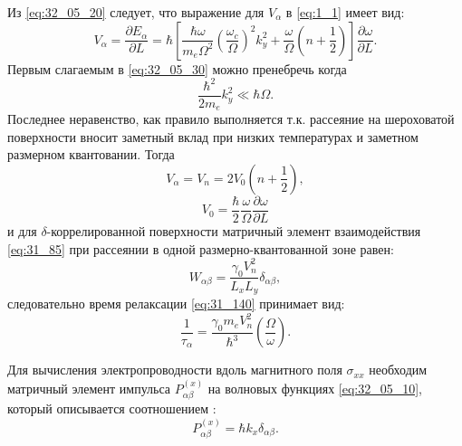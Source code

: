 Из \eqref{eq:32_05_20} следует, что выражение для $ V_{\alpha}$ в \eqref{eq:1_1} имеет вид:
\begin{equation} \label{eq:32_05_30}
V_{\alpha} = \frac{\partial E_{\alpha }}{\partial L}=\hbar \left[\frac{\hbar\omega}{m_e \Omega^2} {\left(\frac{\omega_c}{\Omega }\right)}^2 k^2_y+\frac{\omega}{\Omega} \left(n+\frac{1}{2}\right)\right] \frac{\partial\omega}{\partial L}.
\end{equation}
Первым слагаемым в \eqref{eq:32_05_30} можно пренебречь когда
\[
\frac{\hbar^2}{2m_e}k^2_y \ll \hbar \Omega.
\]
Последнее неравенство, как правило выполняется т.к. рассеяние на шероховатой поверхности вносит заметный вклад при низких температурах и заметном размерном квантовании. Тогда
\begin{equation} \label{eq:32_05_40}
V_{\alpha} = V_n = 2 V_0 \left(n+\frac{1}{2}\right),
\end{equation}
\begin{equation} \label{eq:32_05_42}
V_0 = \frac{\hbar}{2} \frac{\omega}{\Omega} \frac{\partial\omega}{\partial L}
\end{equation}
и для $\delta$-коррелированной поверхности матричный элемент взаимодействия \eqref{eq:31_85} при рассеянии в одной размерно-квантованной зоне равен:
\begin{equation} \label{eq:32_05_50}
W_{\alpha \beta }=\frac{\gamma_0 V^2_n}{L_x L_y} \delta_{\alpha \beta},
\end{equation}
следовательно время релаксации \eqref{eq:31_140} принимает вид:
\begin{equation} \label{eq:32_05_60}
\frac{1}{\tau_{\alpha }}=\frac{\gamma_0 m_e V_n^2}{\hbar^3}\left(\frac{\Omega }{\omega }\right).
\end{equation}

Для вычисления электропроводности вдоль магнитного поля $\sigma_{xx}$ необходим матричный элемент импульса $P^{(x)}_{\alpha\beta}$ на волновых функциях \eqref{eq:32_05_10}, который описывается соотношением \cite{Sinyavskii1998}:
\begin{equation} \label{eq:32_05_70}
P^{(x)}_{\alpha\beta} =\hbar k_x \delta_{\alpha\beta}.
\end{equation}

